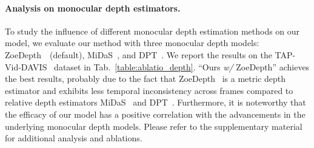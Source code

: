 \vspace{-0.5em}
\paragraph{Analysis on monocular depth estimators.}
To study the influence of different monocular depth estimation methods on our model, we evaluate our method with three monocular depth models: ZoeDepth~\cite{ZoeDepth}~(default), MiDaS~\cite{birkl2023midas}, and DPT~\cite{ranftl2021vision}.
We report the results on the TAP-Vid-DAVIS~\cite{pont20172017,tap-vid} dataset in Tab.~\ref{table:ablatio_depth}.
``Ours \textit{w/} ZoeDepth'' achieves the best results, probably due to the fact that ZoeDepth~\cite{ZoeDepth} is a metric depth estimator and exhibits less temporal inconsistency across frames compared to relative depth estimators MiDaS~\cite{birkl2023midas} and DPT~\cite{ranftl2021vision}.
Furthermore, it is noteworthy that the efficacy of our model has a positive correlation with the advancements in the underlying monocular depth models. 
Please refer to the supplementary material for additional analysis and ablations.






